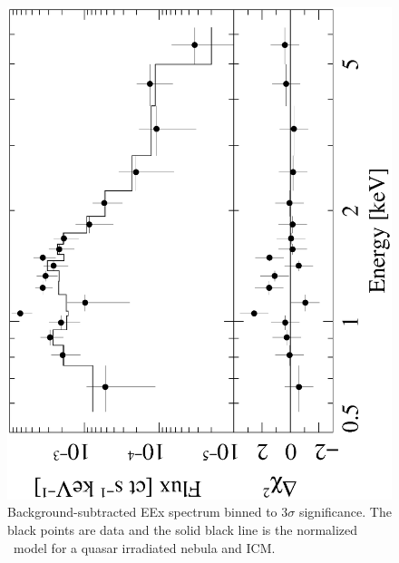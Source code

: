 \begin{figure}
  \begin{center}
    \begin{minipage}{\linewidth}
      \includegraphics*[angle=270, width=\textwidth, trim=0mm 20mm 0mm 0mm, clip]{qso_ec.ps}
    \end{minipage}
    \caption{Background-subtracted EEx spectrum binned to
      $3\sigma$ significance. The black points are data and the
      solid black line is the normalized \cloudy\ model for a
      quasar irradiated nebula and ICM.}
    \label{fig:qso}
  \end{center}
\end{figure}

